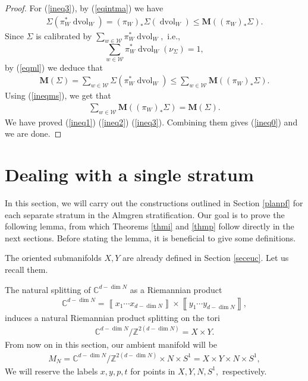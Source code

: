 \documentclass[11pt,a4paper]{amsart}
\numberwithin{equation}{section}
\newcommand{\Si}{\Sigma}
\newcommand{\ms}{\mathbf{M}}
\newcommand{\cd}{\cdots}
\newcommand{\cu}[1]{\left\llbracket#1\right\rrbracket}
\newcommand{\dvol}{\operatorname{dvol}}
\newcommand{\du}{^\ast}
\newcommand{\pf}{_\ast}
\newcommand{\cz}{\C^{d-\dim N}/\Z^{2(d-\dim N)}}
\newcommand{\Z}{\mathbb{Z}}
\newcommand{\C}{\mathbb{C}}
\theoremstyle{plain}
\theoremstyle{definition}
\numberwithin{equation}{subsection}
\begin{document}
\begin{proof}
For (\ref{ineq3}), %
by (\ref{eqintma}) we have
\begin{align}\label{eqml}
\Si(\pi_W\du\dvol_W)=(\pi_W)\pf\Si(\dvol_W)\le\ms((\pi_W)\pf \Si).
\end{align}  Since $\Si$ is calibrated by $\sum_{w\in\mathcal{W}}\pi_W\du\dvol_W,$ i.e., $$\sum_{w\in\mathcal{W}}\pi_W\du\dvol_W(\nu_\Si)=1,$$ by (\ref{eqml})  we deduce that
\begin{align*}
	\ms(\Si)=	\sum_{w\in\mathcal{W}}\Si(\pi\du_W\dvol_W)\le\sum_{w\in\mathcal{W}}\ms((\pi_W)\pf \Si).
\end{align*}
Using (\ref{ineqms}), we get that
\begin{align*}
	\sum_{w\in\mathcal{W}}\ms((\pi_W)\pf \Si)=\ms(\Si).
\end{align*}
We have proved (\ref{ineq1}) (\ref{ineq2}) (\ref{ineq3}). Combining them gives (\ref{ineq0}) and we are done.
\end{proof}
\section{Dealing with a single stratum}\label{secss}
In this section, we will carry out the constructions outlined in Section \ref{planpf} for each separate stratum in the Almgren stratification. Our goal is to prove the following lemma, from which Theorems \ref{thmi} and \ref{thmp} follow directly in the next sections. Before stating the lemma, it is beneficial to give some definitions.%

The oriented submanifolds $X,Y$ are already defined in Section \ref{seceuc}. Let us recall them.

The natural splitting of $\C^{d-\dim N}$ as a Riemannian  product
\begin{align*}
	\C^{d-\dim N}=\cu{x_1\cd x_{d-\dim N}}\times \cu{y_1\cd y_{d-\dim N}},
\end{align*} 
induces a natural Riemannian product splitting on the tori
\begin{align*}
	\cz=X\times Y.
\end{align*}
From now on in this section, our ambient manifold will be
\begin{align}
	M_N=\C^{d-\dim N}/\Z^{2(d-\dim N)}\times N\times S^1=X\times Y\times N\times S^1,
\end{align}
We will reserve the labels $x,y,p,t$ for points in $X,Y,N,S^1,$ respectively. 
\end{document}
